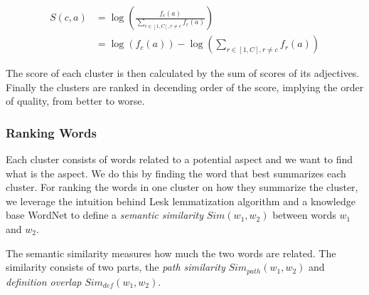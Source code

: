 \begin{align*}
	S(c, a) &= \log\left(\frac{f_c(a)}{\sum_{r\in[1, C], r\neq c} f_r(a)}\right) \\
			&= \log(f_c(a)) - \log(\sum_{r\in[1, C], r\neq c} f_r(a))
\end{align*}

The score of each cluster is then calculated by the sum of scores of its adjectives. Finally the clusters are ranked in decending order of the score, implying the order of quality, from better to worse.

\subsubsection{Ranking Words}
Each cluster consists of words related to a potential aspect and we want to find what is the aspect. We do this by finding the word that best summarizes each cluster. For ranking the words in one cluster on how they summarize the cluster, we leverage the intuition behind Lesk lemmatization algorithm and a knowledge base WordNet to define a \emph{semantic similarity} $Sim(w_1, w_2)$ between words $w_1$ and $w_2$.

The semantic similarity measures how much the two words are related. The similarity consists of two parts, the \emph{path similarity} $Sim_{path}(w_1, w_2)$ and \emph{definition overlap} $Sim_{def}(w_1, w_2)$.
